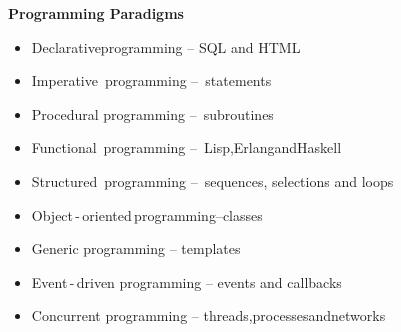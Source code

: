 \documentclass{beamer}
\begin{document}
\begin{frame}{\bf Programming Paradigms}
    
    \begin{itemize}

        \item Declarative\;programming -- SQL and HTML

        \item Imperative\, programming -- \,statements

        \item Procedural programming -- \,subroutines

        \item Functional\, programming -- \,Lisp,\:Erlang\:and\:Haskell
        
        \item Structured\, programming -- \,sequences, selections and loops 
        
        \item Object\,-\,oriented\,programming\;--\;classes
        
        \item Generic programming -- templates

        \item Event\,-\,driven programming -- events and callbacks
        
        \item Concurrent programming -- threads,\;processes\;and\;networks
        
    \end{itemize}
    
\end{frame}
\end{document}
